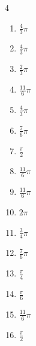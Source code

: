 \begin{multicols}{4}
\begin{enumerate}
  \item $\displaystyle \frac{4}{3}\pi$

  \item $\displaystyle \frac{4}{3}\pi$

  \item $\displaystyle \frac{2}{3}\pi$

  \item $\displaystyle \frac{11}{6}\pi$

  \item $\displaystyle \frac{4}{3}\pi$

  \item $\displaystyle \frac{7}{6}\pi$

  \item $\displaystyle \frac{\pi}{2}$

  \item $\displaystyle \frac{11}{6}\pi$

  \item $\displaystyle \frac{11}{6}\pi$

  \item $\displaystyle 2\pi$

  \item $\displaystyle \frac{3}{4}\pi$

  \item $\displaystyle \frac{7}{6}\pi$

  \item $\displaystyle \frac{\pi}{4}$

  \item $\displaystyle \frac{\pi}{6}$

  \item $\displaystyle \frac{11}{6}\pi$

  \item $\displaystyle \frac{\pi}{2}$


\end{enumerate}
\end{multicols}
